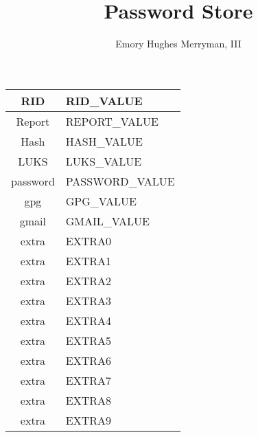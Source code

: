 \documentclass{article}
\begin{document}
\title{Password Store}
\author{Emory Hughes Merryman, III}
\maketitle
\begin{tabular}{||c|p{10cm}||}
  \hline
  RID & RID_VALUE \\ \hline
  Report & REPORT_VALUE \\ \hline
  Hash & HASH_VALUE \\ \hline
  LUKS & LUKS_VALUE \\ \hline
  password & PASSWORD_VALUE \\ \hline
  gpg & GPG_VALUE \\ \hline
  gmail & GMAIL_VALUE \\ \hline
  extra & EXTRA0 \\ \hline
  extra & EXTRA1 \\ \hline
  extra & EXTRA2 \\ \hline
  extra & EXTRA3 \\ \hline
  extra & EXTRA4 \\ \hline
  extra & EXTRA5 \\ \hline
  extra & EXTRA6 \\ \hline
  extra & EXTRA7 \\ \hline
  extra & EXTRA8 \\ \hline
  extra & EXTRA9 \\ \hline
  \hline
\end{tabular}
\end{document}
